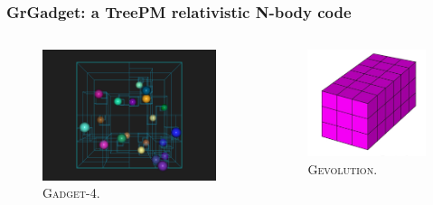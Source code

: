 \documentclass{beamer}
\makeatletter
\newcommand{\mylabel}{%
}
\newcommand{\gadget}{\textsc{Gadget-4}}
\newcommand{\gevolution}{\textsc{Gevolution}}
\makeatother
\begin{document}
\begin{frame}[label=octtreepm]
    \frametitle{GrGadget: a TreePM relativistic N-body code\mylabel}
    \begin{columns}
        \begin{column}{.5\textwidth}
	\vspace*{\fill}
            \begin{figure}
                \includegraphics[height=.5\textheight]{images/octree.png}
                \caption{\gadget.}
            \end{figure}
        \end{column}
        \begin{column}{.5\textwidth}
	\vspace*{\fill}
            \begin{figure}
                \includegraphics[height=.5\textheight]{images/cubic-grid.jpeg}
                \caption{\gevolution.}
            \end{figure}
        \end{column}
    \end{columns}
\end{frame}
\end{document}
